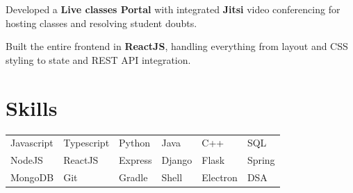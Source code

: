 \documentclass[]{plushcv}
\begin{document}
\begin{minipage}[t]{0.57\textwidth}
\begin{tightemize}
\sectionsep
\item Developed a \textbf{Live classes Portal} with integrated \textbf{Jitsi} video conferencing for hosting classes and resolving student doubts.
\item Built the entire frontend in \textbf{ReactJS}, handling everything from layout and CSS styling to state and REST API integration.
\end{tightemize}
\sectionsep


\section{Skills}
{\setlength{\tabcolsep}{2pt}
\begin{tabular}{llllll}
\textbullet{}\hspace{5pt}Javascript & \textbullet{}\hspace{5pt}Typescript & \textbullet{}\hspace{5pt}Python & \textbullet{}\hspace{5pt}Java & \textbullet{}\hspace{5pt}C++ & \textbullet{}\hspace{5pt}SQL\\[1pt]
\textbullet{}\hspace{5pt}NodeJS & \textbullet{}\hspace{5pt}ReactJS & \textbullet{}\hspace{5pt}Express & \textbullet{}\hspace{5pt}Django & \textbullet{}\hspace{5pt}Flask & \textbullet{}\hspace{5pt}Spring\\[1pt]
\textbullet{}\hspace{5pt}MongoDB & \textbullet{}\hspace{5pt}Git & \textbullet{}\hspace{5pt}Gradle & \textbullet{}\hspace{5pt}Shell & \textbullet{}\hspace{5pt}Electron & \textbullet{}\hspace{5pt}DSA\\
\end{tabular}}
\sectionsep


\end{minipage}
\end{document}
